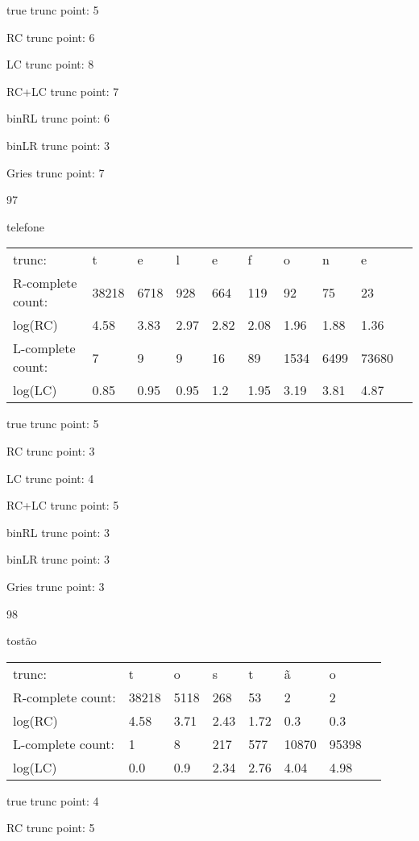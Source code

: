 \documentclass[10pt]{article}
\begin{document}
true trunc point: 5

RC trunc point: 6

LC trunc point: 8

RC+LC trunc point: 7

binRL trunc point: 6

binLR trunc point: 3

Gries trunc point: 7

\newpage

97

telefone

\begin{tabular}{l|lllllllll}
trunc: & t & e & l & e & f & o & n & e & \\ 
R-complete count: & 38218 & 6718 & 928 & 664 & 119 & 92 & 75 & 23 & \\ 
log(RC) & 4.58 & 3.83 & 2.97 & 2.82 & 2.08 & 1.96 & 1.88 & 1.36 & \\ 
L-complete count: & 7 & 9 & 9 & 16 & 89 & 1534 & 6499 & 73680 & \\ 
log(LC) & 0.85 & 0.95 & 0.95 & 1.2 & 1.95 & 3.19 & 3.81 & 4.87 & \\ 
\end{tabular}

true trunc point: 5

RC trunc point: 3

LC trunc point: 4

RC+LC trunc point: 5

binRL trunc point: 3

binLR trunc point: 3

Gries trunc point: 3

\vspace{1em}

98

tostão

\begin{tabular}{l|lllllll}
trunc: & t & o & s & t & ã & o & \\ 
R-complete count: & 38218 & 5118 & 268 & 53 & 2 & 2 & \\ 
log(RC) & 4.58 & 3.71 & 2.43 & 1.72 & 0.3 & 0.3 & \\ 
L-complete count: & 1 & 8 & 217 & 577 & 10870 & 95398 & \\ 
log(LC) & 0.0 & 0.9 & 2.34 & 2.76 & 4.04 & 4.98 & \\ 
\end{tabular}

true trunc point: 4

RC trunc point: 5
\end{document}
